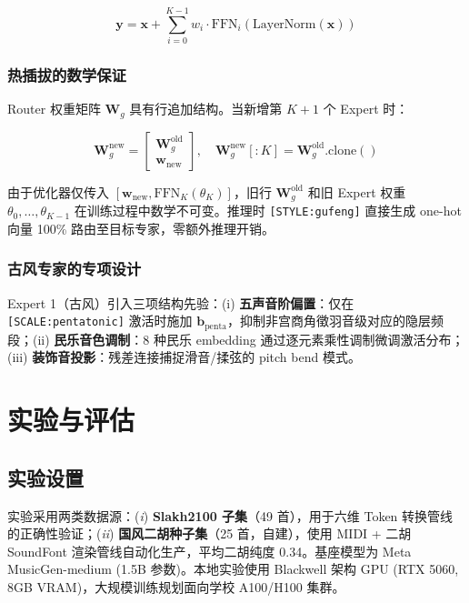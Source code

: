 \documentclass[UTF8,12pt,a4paper]{ctexart}
\begin{document}
\begin{equation}
\mathbf{y} = \mathbf{x} + \sum_{i=0}^{K-1} w_i \cdot \text{FFN}_i(\text{LayerNorm}(\mathbf{x}))
\end{equation}

\subsubsection{热插拔的数学保证}

Router 权重矩阵 $\mathbf{W}_g$ 具有行追加结构。当新增第 $K+1$ 个 Expert 时：

\begin{equation}
\mathbf{W}_g^{\text{new}} = \begin{bmatrix}
\mathbf{W}_g^{\text{old}} \\ \hline \mathbf{w}_{\text{new}}
\end{bmatrix},\quad
\mathbf{W}_g^{\text{new}}[:K] = \mathbf{W}_g^{\text{old}}.\text{clone}()
\end{equation}

由于优化器仅传入 $[\mathbf{w}_{\text{new}}, \text{FFN}_{K}(\theta_K)]$，旧行 $\mathbf{W}_g^{\text{old}}$ 和旧 Expert 权重 $\theta_0,\dots,\theta_{K-1}$ 在训练过程中数学不可变。推理时 \texttt{[STYLE:gufeng]} 直接生成 one-hot 向量 100\% 路由至目标专家，零额外推理开销。

\subsubsection{古风专家的专项设计}

Expert 1（古风）引入三项结构先验：(i) \textbf{五声音阶偏置}：仅在 \texttt{[SCALE:pentatonic]} 激活时施加 $\mathbf{b}_{\text{penta}}$，抑制非宫商角徵羽音级对应的隐层频段；(ii) \textbf{民乐音色调制}：8 种民乐 embedding 通过逐元素乘性调制微调激活分布；(iii) \textbf{装饰音投影}：残差连接捕捉滑音/揉弦的 pitch bend 模式。


\section{实验与评估}

\subsection{实验设置}

实验采用两类数据源：(\textit{i}) \textbf{Slakh2100 子集}（49 首），用于六维 Token 转换管线的正确性验证；(\textit{ii}) \textbf{国风二胡种子集}（25 首，自建），使用 MIDI + 二胡 SoundFont 渲染管线自动化生产，平均二胡纯度 0.34。基座模型为 Meta MusicGen-medium (1.5B 参数)。本地实验使用 Blackwell 架构 GPU (RTX 5060, 8GB VRAM)，大规模训练规划面向学校 A100/H100 集群。
\end{document}
